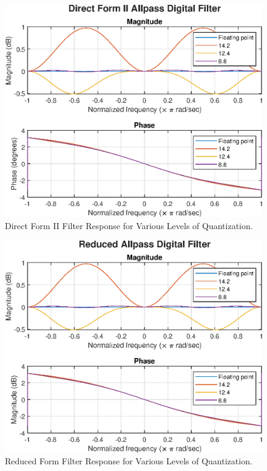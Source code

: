 \documentclass[journal,12pt,twocolumn]{IEEEtran}
\begin{document}
\begin{enumerate}
\begin{enumerate}
            \begin{figure}[!ht]
                \centering
                \includegraphics[width=\columnwidth]{figs/q1_fig1.eps}
                \caption{Direct Form II Filter Response for Various Levels of Quantization.}
                \label{fig:res-df2}
            \end{figure}

            \begin{figure}[!ht]
                \centering
                \includegraphics[width=\columnwidth]{figs/q1_fig2.eps}
                \caption{Reduced Form Filter Response for Various Levels of Quantization.}
                \label{fig:res-red}
            \end{figure}
    \end{enumerate}


\end{enumerate}
\end{document}
